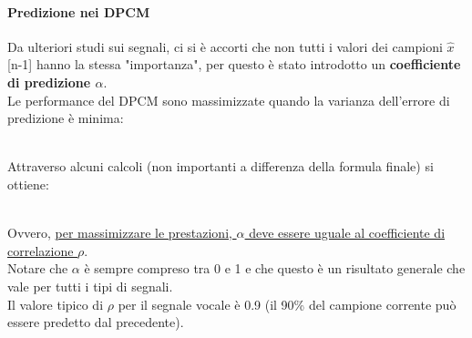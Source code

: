 \documentclass{article}
\begin{document}
				\paragraph{Predizione nei DPCM\\}
					\noindent Da ulteriori studi sui segnali, ci si è accorti che non tutti i valori dei campioni $\hat{x}$[n-1] hanno la stessa "importanza", per questo è stato introdotto un \textbf{coefficiente di predizione \textit{$\alpha$}}.
					\\Le performance del DPCM sono massimizzate quando la varianza dell'errore di predizione è minima:
					\begin{figure}[ht!]
					\end{figure}
					\\Attraverso alcuni calcoli (non importanti a differenza della formula finale) si ottiene:
					\begin{figure}[ht!]
					\end{figure}
					\\Ovvero, \underline{per massimizzare le prestazioni, \textit{$\alpha$} deve essere uguale al coefficiente di} \\\underline{correlazione \textit{$\rho$}}.
					\\Notare che \textit{$\alpha$} è sempre compreso tra 0 e 1 e che questo è un risultato generale che vale per tutti i tipi di segnali.
					\\Il valore tipico di \textit{$\rho$} per il segnale vocale è 0.9 (il 90\% del campione corrente può essere predetto dal precedente).
\end{document}
